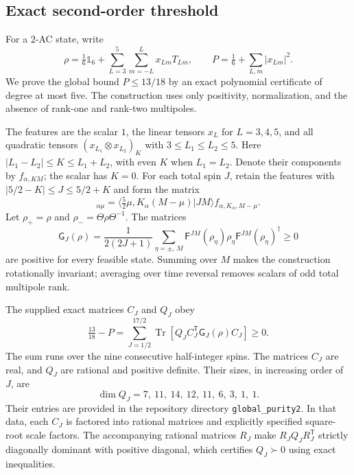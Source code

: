 \documentclass[11pt]{article}
\DeclareMathOperator{\Tr}{Tr}
\begin{document}
\subsection{Exact second-order threshold}
\label{app:spin52_purity2}
For a $2$-AC state, write
\begin{equation}
 \rho=\tfrac16\mathbb 1_6+
 \sum_{L=3}^{5}\sum_{m=-L}^{L}x_{Lm}T_{Lm},\qquad
 P=\tfrac16+\sum_{L,m}|x_{Lm}|^2.
\end{equation}
We prove the global bound $P\le13/18$ by an exact polynomial
certificate of degree at most five. The construction uses only
positivity, normalization, and the absence of rank-one and rank-two
multipoles.

The features are the scalar $1$, the linear tensors $x_L$ for
$L=3,4,5$, and all quadratic tensors
$(x_{L_1}\otimes x_{L_2})_K$ with $3\le L_1\le L_2\le5$.
Here $|L_1-L_2|\le K\le L_1+L_2$, with even $K$ when $L_1=L_2$.
Denote their components by $f_{\alpha,KM}$; the scalar has $K=0$.
For each total spin $J$, retain the features with
$|5/2-K|\le J\le5/2+K$ and form the matrix
\begin{equation}
 [\mathsf F^{JM}(\rho)]_{\alpha\mu}
 =\langle\tfrac52\mu,K_\alpha(M-\mu)|JM\rangle
 f_{\alpha,K_\alpha,M-\mu}.
\end{equation}
Let $\rho_+=\rho$ and $\rho_-=\Theta\rho\Theta^{-1}$. The matrices
\begin{equation}
 \mathsf G_J(\rho)=\frac1{2(2J+1)}
 \sum_{\eta=\pm,\,M}
 \mathsf F^{JM}(\rho_\eta)\rho_\eta
 \mathsf F^{JM}(\rho_\eta)^\dagger\ge0
\end{equation}
are positive for every feasible state. Summing over $M$ makes the
construction rotationally invariant; averaging over time reversal
removes scalars of odd total multipole rank.

The supplied exact matrices $C_J$ and $Q_J$ obey
\begin{equation}\label{eq:spin52_P2_certificate}
 \boxed{\ \tfrac{13}{18}-P
 =\sum_{J=1/2}^{17/2}
 \Tr\!\left[Q_JC_J^{\mathsf T}\mathsf G_J(\rho)C_J\right]
 \ge0.\ }
\end{equation}
The sum runs over the nine consecutive half-integer spins.
The matrices $C_J$ are real, and $Q_J$ are rational and positive
definite. Their sizes, in increasing order of $J$, are
\begin{equation}
 \dim Q_J=7,\ 11,\ 14,\ 12,\ 11,\ 6,\ 3,\ 1,\ 1.
\end{equation}
Their entries are provided in the repository directory
\texttt{global\_purity2}. In that data, each $C_J$ is factored into
rational matrices and explicitly specified square-root scale factors.
The accompanying rational matrices $R_J$ make
$R_JQ_JR_J^{\mathsf T}$ strictly diagonally dominant with positive
diagonal, which certifies $Q_J\succ0$ using exact inequalities.
\end{document}

